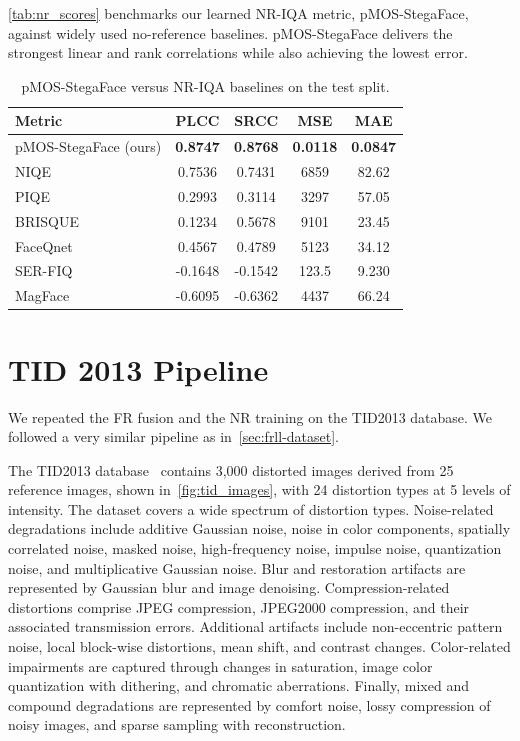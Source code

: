 \autoref{tab:nr_scores} benchmarks our learned \acs{NR-IQA} metric, \acs{pMOS-StegaFace}, against widely used no-reference baselines. \acs{pMOS-StegaFace} delivers the strongest linear and rank correlations while also achieving the lowest error.

\begin{table}[htpb]
\centering
\caption{\acs{pMOS-StegaFace} versus \acs{NR-IQA} baselines on the test split.}\label{tab:nr_scores}
\begin{tabular}{lcccc}
\hline
\textbf{Metric}  & \textbf{\acs{PLCC}} & \textbf{\acs{SRCC}} & \textbf{\acs{MSE}} & \textbf{\acs{MAE}} \\
\hline
\acs{pMOS-StegaFace} (ours)  & \textbf{0.8747} & \textbf{0.8768} & \textbf{0.0118} & \textbf{0.0847} \\
\acs{NIQE}                & 0.7536          & 0.7431          & 6859           & 82.62 \\
\acs{PIQE}                & 0.2993          & 0.3114          & 3297           & 57.05 \\
\acs{BRISQUE}             & 0.1234          & 0.5678          & 9101           & 23.45 \\
\acs{FaceQnet}            & 0.4567          & 0.4789          & 5123           & 34.12 \\
\acs{SER-FIQ}             & -0.1648         & -0.1542         & 123.5          & 9.230 \\
\acs{MagFace}             & -0.6095         & -0.6362         & 4437           & 66.24 \\
\hline
\end{tabular}
\end{table}

\section{\acl{TID} 2013 Pipeline}\label{sec:tid2013}

We repeated the \acs{FR} fusion and the \acs{NR} training on the \acs{TID}2013 database. We followed a very similar pipeline as in~\autoref{sec:frll-dataset}.

The \acs{TID}2013 database~\cite{tid2013} contains 3{,}000 distorted images derived from 25 reference images, shown in~\autoref{fig:tid_images}, with 24 distortion types at 5 levels of intensity. The dataset covers a wide spectrum of distortion types. Noise-related degradations include additive Gaussian noise, noise in color components, spatially correlated noise, masked noise, high-frequency noise, impulse noise, quantization noise, and multiplicative Gaussian noise. Blur and restoration artifacts are represented by Gaussian blur and image denoising. Compression-related distortions comprise \acs{JPEG} compression, \acs{JPEG}2000 compression, and their associated transmission errors. Additional artifacts include non-eccentric pattern noise, local block-wise distortions, mean shift, and contrast changes. Color-related impairments are captured through changes in saturation, image color quantization with dithering, and chromatic aberrations. Finally, mixed and compound degradations are represented by comfort noise, lossy compression of noisy images, and sparse sampling with reconstruction.

